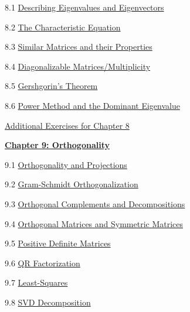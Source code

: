 \documentclass{ximera}
\begin{document}
8.1	\href{https://ximera.osu.edu/linearalgebradzv3/LinearAlgebraInteractiveIntro/EIG-0010/main}{Describing Eigenvalues and Eigenvectors}
	
8.2	\href{https://ximera.osu.edu/linearalgebradzv3/LinearAlgebraInteractiveIntro/EIG-0020/main}{The Characteristic Equation}
	
8.3	\href{https://ximera.osu.edu/linearalgebradzv3/LinearAlgebraInteractiveIntro/EIG-0040/main}{Similar Matrices and their Properties}
	
8.4	\href{https://ximera.osu.edu/linearalgebradzv3/LinearAlgebraInteractiveIntro/EIG-0050/main}{Diagonalizable Matrices/Multiplicity}
	
8.5	\href{https://ximera.osu.edu/linearalgebradzv3/LinearAlgebraInteractiveIntro/EIG-0080/main}{Gershgorin's Theorem}
	
8.6	\href{https://ximera.osu.edu/linearalgebradzv3/LinearAlgebraInteractiveIntro/EIG-0070/main}{Power Method and the Dominant Eigenvalue}
	
\href{https://ximera.osu.edu/linearalgebradzv3/LinearAlgebraInteractiveIntro/SUPX-0080/main}{Additional Exercises for Chapter 8}
	
\href{https://ximera.osu.edu/linearalgebradzv3/LinearAlgebraInteractiveIntro/XLAChapter_orthogonality/main}{\textbf{Chapter 9: Orthogonality}}
	
9.1	\href{https://ximera.osu.edu/linearalgebradzv3/LinearAlgebraInteractiveIntro/RTH-0010/main}{Orthogonality and Projections}
	
9.2	\href{https://ximera.osu.edu/linearalgebradzv3/LinearAlgebraInteractiveIntro/RTH-0015/main}{Gram-Schmidt Orthogonalization}
	
9.3	\href{https://ximera.osu.edu/linearalgebradzv3/LinearAlgebraInteractiveIntro/RTH-0020/main}{Orthogonal Complements and Decompositions}
	
9.4	\href{https://ximera.osu.edu/linearalgebradzv3/LinearAlgebraInteractiveIntro/RTH-0035/main}{Orthogonal Matrices and Symmetric Matrices}
	
9.5	\href{https://ximera.osu.edu/linearalgebradzv3/LinearAlgebraInteractiveIntro/RTH-0045/main}{Positive Definite Matrices}
	
9.6	\href{https://ximera.osu.edu/linearalgebradzv3/LinearAlgebraInteractiveIntro/RTH-0040/main}{QR Factorization}
	
9.7	\href{https://ximera.osu.edu/linearalgebradzv3/LinearAlgebraInteractiveIntro/RTH-0030/main}{Least-Squares}
	
9.8	\href{https://ximera.osu.edu/linearalgebradzv3/LinearAlgebraInteractiveIntro/RTH-0060/main}{SVD Decomposition}
	
\end{document}
